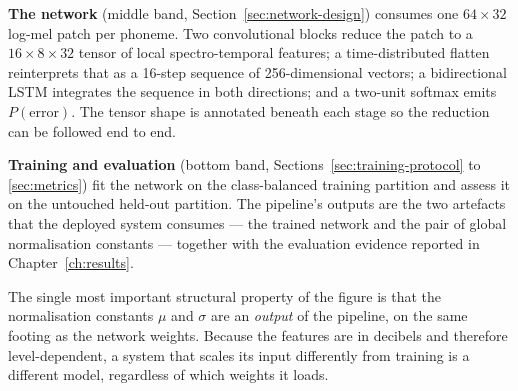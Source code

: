 \textbf{The network} (middle band, Section~\ref{sec:network-design}) consumes
one $64 \times 32$ log-mel patch per phoneme. Two convolutional blocks reduce
the patch to a $16 \times 8 \times 32$ tensor of local spectro-temporal
features; a time-distributed flatten reinterprets that as a 16-step sequence of
256-dimensional vectors; a bidirectional LSTM integrates the sequence in both
directions; and a two-unit softmax emits $P(\text{error})$. The tensor shape is
annotated beneath each stage so the reduction can be followed end to end.

\textbf{Training and evaluation} (bottom band,
Sections~\ref{sec:training-protocol} to \ref{sec:metrics}) fit the network on
the class-balanced training partition and assess it on the untouched held-out
partition. The pipeline's outputs are the two artefacts that the deployed
system consumes --- the trained network and the pair of global normalisation
constants --- together with the evaluation evidence reported in
Chapter~\ref{ch:results}.

The single most important structural property of the figure is that the
normalisation constants $\mu$ and $\sigma$ are an \emph{output} of the
pipeline, on the same footing as the network weights. Because the features are
in decibels and therefore level-dependent, a system that scales its input
differently from training is a different model, regardless of which weights it
loads.

